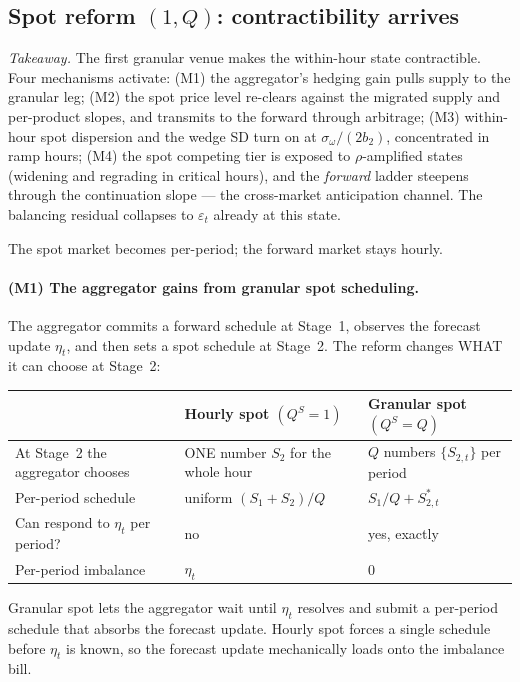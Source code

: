 \documentclass[11pt,a4paper]{article}
\theoremstyle{definition}
\theoremstyle{remark}
\theoremstyle{plain}
\begin{document}
\subsection{Spot reform $(1,Q)$: contractibility arrives}\label{sec:id15}

\emph{Takeaway.} The first granular venue makes the within-hour state contractible. Four mechanisms activate: (M1) the aggregator's hedging gain pulls supply to the granular leg; (M2) the spot price level re-clears against the migrated supply and per-product slopes, and transmits to the forward through arbitrage; (M3) within-hour spot dispersion and the wedge SD turn on at $\sigma_\omega/(2b_2)$, concentrated in ramp hours; (M4) the spot competing tier is exposed to $\rho$-amplified states (widening and regrading in critical hours), and the \emph{forward} ladder steepens through the continuation slope --- the cross-market anticipation channel. The balancing residual collapses to $\varepsilon_t$ already at this state.

The spot market becomes per-period; the forward market stays hourly.

\paragraph{(M1) The aggregator gains from granular spot scheduling.} The aggregator commits a forward schedule at Stage~1, observes the forecast update $\eta_t$, and then sets a spot schedule at Stage~2. The reform changes WHAT it can choose at Stage~2:
\begin{center}
\footnotesize
\begin{tabular}{l l l}
\toprule
                                  & \textbf{Hourly spot} $(Q^S = 1)$           & \textbf{Granular spot} $(Q^S = Q)$ \\
\midrule
At Stage~2 the aggregator chooses & ONE number $S_2$ for the whole hour        & $Q$ numbers $\{S_{2,t}\}$ per period \\
Per-period schedule               & uniform $(S_1 + S_2)/Q$                    & $S_1/Q + S_{2,t}^*$ \\
Can respond to $\eta_t$ per period? & no                                      & yes, exactly \\
Per-period imbalance              & $\eta_t$                                   & $0$ \\
\bottomrule
\end{tabular}
\end{center}
Granular spot lets the aggregator wait until $\eta_t$ resolves and submit a per-period schedule that absorbs the forecast update. Hourly spot forces a single schedule before $\eta_t$ is known, so the forecast update mechanically loads onto the imbalance bill.
\end{document}
